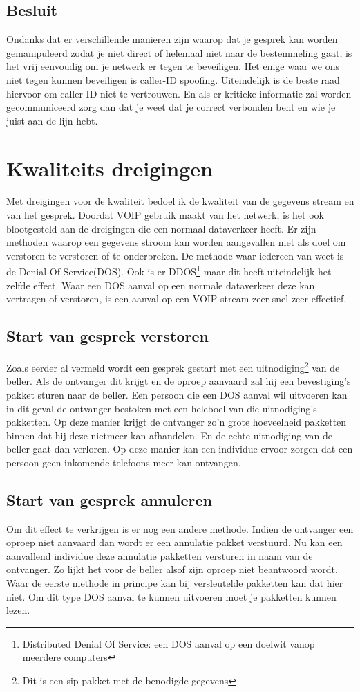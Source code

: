 \documentclass[pdftex,a4paper,12pt,twoside]{report}
\begin{document}
\subsection{Besluit}
Ondanks dat er verschillende manieren zijn waarop dat je gesprek kan worden gemanipuleerd zodat je niet direct of helemaal niet naar de bestemmeling gaat, is het vrij eenvoudig om je netwerk er tegen te beveiligen. Het enige waar we ons niet tegen kunnen beveiligen is caller-ID spoofing. Uiteindelijk is de beste raad hiervoor om caller-ID niet te vertrouwen. En als er kritieke informatie zal worden gecommuniceerd zorg dan dat je weet dat je correct verbonden bent en wie je juist aan de lijn hebt. 
\newpage

\section{Kwaliteits dreigingen}
Met dreigingen voor de kwaliteit bedoel ik de kwaliteit van de gegevens stream en van het gesprek. Doordat VOIP gebruik maakt van het netwerk, is het ook blootgesteld aan de dreigingen die een normaal dataverkeer heeft. Er zijn methoden waarop een gegevens stroom  kan worden aangevallen met als doel om verstoren te verstoren of te onderbreken. De methode waar iedereen van weet is de Denial Of Service(DOS). Ook is er DDOS\footnote{Distributed Denial Of Service: een DOS aanval op een doelwit vanop meerdere computers} maar dit heeft uiteindelijk het zelfde effect. Waar een DOS aanval op een normale dataverkeer deze kan vertragen of verstoren, is een aanval op een VOIP stream zeer snel zeer effectief. 

\subsection{Start van gesprek verstoren}
Zoals eerder al vermeld wordt een gesprek gestart met een uitnodiging\footnote{Dit is een sip pakket met de benodigde gegevens} van de beller. Als de ontvanger dit krijgt en de oproep aanvaard zal hij een bevestiging's pakket sturen naar de beller. Een persoon die een DOS aanval wil uitvoeren kan in dit geval de ontvanger bestoken met een heleboel van die uitnodiging's pakketten. Op deze manier krijgt de ontvanger zo'n grote hoeveelheid pakketten binnen dat hij deze nietmeer kan afhandelen. En de echte uitnodiging van de beller gaat dan verloren. Op deze manier kan een individue ervoor zorgen dat een persoon geen inkomende telefoons meer kan ontvangen.

\subsection{Start van gesprek annuleren}
Om dit effect te verkrijgen is er nog een andere methode. Indien de ontvanger een oproep niet aanvaard dan wordt er een annulatie pakket verstuurd. Nu kan een aanvallend individue deze annulatie pakketten versturen in naam van de ontvanger. Zo lijkt het voor de beller alsof zijn oproep niet beantwoord wordt. Waar de eerste methode in principe kan bij versleutelde pakketten kan dat hier niet. Om dit type DOS aanval te kunnen uitvoeren moet je pakketten kunnen lezen.
\end{document}
